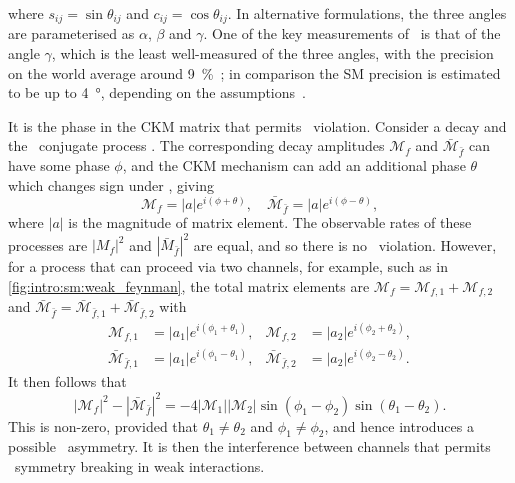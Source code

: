 where $s_{ij} = \sin{\theta_{ij}}$ and $c_{ij} = \cos{\theta_{ij}}$.
In alternative formulations, the three angles are parameterised as $\alpha$, 
$\beta$ and $\gamma$.
One of the key measurements of \lhcb\ is that of the angle $\gamma$, which is 
the least well-measured of the three angles, with the precision on the world 
average around \SI{9}{\percent}~\cite{LHCb-CONF-2016-001}; in comparison the 
\ac{SM} precision is estimated to be up to \SI{4}{\degree}, depending on the 
assumptions~\cite{Brod:2013sga,Brod:2014bfa}.

It is the phase in the \ac{CKM} matrix that permits \CP\ violation.
Consider a decay  and the \CP\ conjugate process
.
The corresponding decay amplitudes $\mathcal{M}_{f}$ and 
$\bar{\mathcal{M}}_{\bar{f}}$ can have some phase $\phi$, and the \ac{CKM} 
mechanism can add an additional phase $\theta$ which changes sign under \CP, 
giving
\begin{equation}
  \mathcal{M}_{f}             = |a| e^{i(\phi + \theta)}, \quad
  \bar{\mathcal{M}}_{\bar{f}} = |a| e^{i(\phi - \theta)},
  \label{eqn:intro:sm:weak:amplitudes_one}
\end{equation}
where $|a|$ is the magnitude of matrix element.
The observable rates of these processes are $|M_{f}|^{2}$ and 
$|\bar{M}_{\bar{f}}|^{2}$ are equal, and so there is no \CP\ violation.
However, for a process that can proceed via two channels, for example, such as 
in \cref{fig:intro:sm:weak_feynman}, the total matrix elements are 
$\mathcal{M}_{f} = \mathcal{M}_{f,1} + \mathcal{M}_{f,2}$ and 
$\bar{\mathcal{M}}_{\bar{f}} = \bar{\mathcal{M}}_{\bar{f},1} + 
\bar{\mathcal{M}}_{\bar{f},2}$ with
\begin{align*}
  \mathcal{M}_{f,1} &= |a_{1}| e^{i(\phi_{1} + \theta_{1})}, &
  \mathcal{M}_{f,2} &= |a_{2}| e^{i(\phi_{2} + \theta_{2})},\\
  \bar{\mathcal{M}}_{\bar{f},1} &= |a_{1}| e^{i(\phi_{1} - \theta_{1})}, &
  \bar{\mathcal{M}}_{\bar{f},2} &= |a_{2}| e^{i(\phi_{2} - \theta_{2})}.
\end{align*}
It then follows that
\begin{equation*}
  |\mathcal{M}_{f}|^{2} - |\bar{\mathcal{M}}_{\bar{f}}|^{2} =
  -4|\mathcal{M}_{1}||\mathcal{M}_{2}|\sin(\phi_{1} - \phi_{2})\sin(\theta_{1} 
  - \theta_{2}).
\end{equation*}
This is non-zero, provided that $\theta_{1} \neq \theta_{2}$ and $\phi_{1} \neq 
\phi_{2}$, and hence introduces a possible \CP\ asymmetry.
It is then the interference between channels that permits \CP\ symmetry 
breaking in weak interactions.

